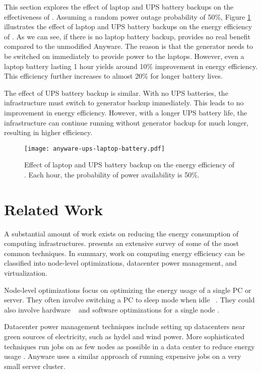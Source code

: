 This section explores the effect of laptop and UPS battery backups on the 
effectiveness of \anywaredc{}. Assuming a random power outage probability of 50\%,
Figure \ref{fig:anyware-ups-laptop-battery} illustrates the effect of laptop and 
UPS battery backups on the energy efficiency of \anywaredc{}. As we can see, if
there is no laptop battery backup, \anywaredc{} provides no real benefit
compared to the unmodified Anyware. The reason is that the generator needs to
be switched on immediately to provide power to the laptops. However, even a laptop
battery lasting 1 hour yields around 10\% improvement in energy efficiency. This
efficiency further increases to almost 20\% for longer battery lives.

The effect of UPS battery backup is similar. With no UPS batteries, the infrastructure
must switch to generator backup immediately. This leads to no improvement in energy efficiency. 
However, with a longer UPS battery life, the infrastructure can continue running
without generator backup for much longer, resulting in higher efficiency.


\begin{figure}[h!]
\centering
\texttt{[image: anyware-ups-laptop-battery.pdf]}
\caption{Effect of laptop and UPS battery backup on the energy efficiency of
\anywaredc{}. Each hour, the probability of power availability is 50\%.}
\label{fig:anyware-ups-laptop-battery}
\end{figure}


\section{Related Work}
\label{sec:related}

A substantial amount of work exists on reducing the energy consumption of computing
infrastructures. \cite{orgerie2014survey} presents an extensive survey of some of
the most common techniques. In summary, work on computing energy efficiency can be
classified into node-level optimizations, datacenter power management, 
and virtualization.

Node-level optimizations focus on optimizing the energy usage of a 
single PC or server. They often involve switching a PC to sleep mode when 
idle ~\cite{Reich2010, Sen2012-GreenUp}. They could
also involve hardware ~\cite{snowdon2005power} and software optimizations for 
a single node \cite{blanquicet2008managing}.

Datacenter power management techniques include setting up datacenters near 
green sources of electricity, such as hydel and wind power. More sophisticated
techniques run jobs on as few nodes as possible in a data center to reduce
energy usage \cite{chase2001balance}. Anyware uses a similar approach of running expensive jobs on
a very small server cluster.

